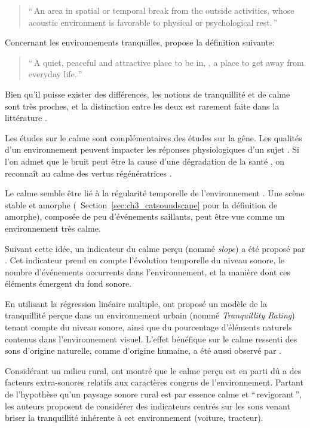 \begin{quote}
``\,An area in spatial or temporal break from the outside activities, whose acoustic environment is favorable to physical or psychological rest.\,''
\end{quote}

Concernant les environnements tranquilles, \citep{pheasant2008acoustic} propose la définition suivante:

\begin{quote}
``\,A quiet, peaceful and attractive place to be in, \ie, a place to get away from everyday life.\,''
\end{quote}

Bien qu'il puisse exister des différences, les notions de tranquillité et de calme sont très proches, et la distinction entre les deux est rarement faite dans la littérature \citep{delaitre2012definition}. 

Les études sur le calme sont complémentaires des études sur la gêne. Les qualités d'un environnement peuvent impacter les réponses physiologiques d'un sujet \citep{hume2013physiological}. Si l'on admet que le bruit peut être la cause d'une dégradation de la santé \citep{stansfeld2005aircraft}, on reconnaît au calme des vertus régénératrices \citep{payne2013production,de2006quiet}.

Le calme semble être lié à la régularité temporelle de l'environnement \citep{delaitre2012definition}. Une scène stable et amorphe (\cf~Section~\ref{sec:ch3_catsoundscape} pour la définition de amorphe), composée de peu d'événements saillants, peut être vue comme un environnement très calme. 

Suivant cette idée, un indicateur du calme perçu (nommé \emph{slope}) a été proposé par \citep{memoli2008soundscape}. Cet indicateur prend en compte l'évolution temporelle du niveau sonore, le nombre d'événements occurrents dans l'environnement, et la manière dont ces éléments émergent du fond sonore. 

En utilisant la régression linéaire multiple, \citep{pheasant2008acoustic,pheasant2009validation} ont proposé un modèle de la tranquillité perçue dans un environnement urbain (nommé \emph{Tranquillity Rating}) tenant compte du niveau sonore, ainsi que du pourcentage d'éléments naturels contenus dans l'environnement visuel. L'effet bénéfique sur le calme ressenti des sons d'origine naturelle, comme d'origine humaine, a été aussi observé par \citep{de2013characterizing}.

Considérant un milieu rural, \citep{de2006quiet} ont montré que le calme perçu est en parti dû a des facteurs extra-sonores relatifs aux caractères congrus de l'environnement. Partant de l'hypothèse qu'un paysage sonore rural est par essence calme et ``\,revigorant\,'', les auteurs proposent de considérer des indicateurs centrés sur les sons venant briser la tranquillité inhérente à cet environnement (voiture, tracteur).

